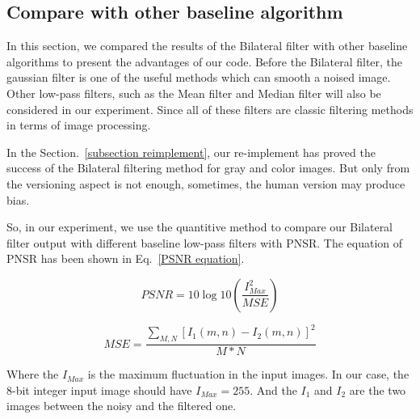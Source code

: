\documentclass[12pt]{article}
\begin{document}
\subsection{Compare with other baseline algorithm}
\label{subsection baseline comparison}
In this section, we compared the results of the Bilateral filter with other baseline algorithms to present the advantages of our code.
Before the Bilateral filter, the gaussian filter is one of the useful methods which can smooth a noised image. 
Other low-pass filters, such as the Mean filter and Median filter will also be considered in our experiment. 
Since all of these filters are classic filtering methods in terms of image processing.

In the Section.~\ref{subsection reimplement}, our re-implement has proved the success of the Bilateral filtering method for gray and color images.
But only from the versioning aspect is not enough, sometimes, the human version may produce bias.

So, in our experiment, we use the quantitive method to compare our Bilateral filter output with different baseline low-pass filters with PNSR.
The equation of PNSR has been shown in Eq.~\ref{PSNR equation}.

\begin{equation}
  PSNR = 10\log 10 (\frac{I_{Max}^{2}}{MSE})
  \label{PSNR equation}
\end{equation}

\begin{equation}
  MSE = \frac{\sum_{M, N}[I_1(m,n) - I_2(m, n)]^2}{M * N}
  \label{MSE}
\end{equation}

Where the $I_{Max}$ is the maximum fluctuation in the input images. 
In our case, the 8-bit integer input image should have $I_{Max} = 255$.
And the $I_1$ and $I_2$ are the two images between the noisy and the filtered one.
  
\end{document}
